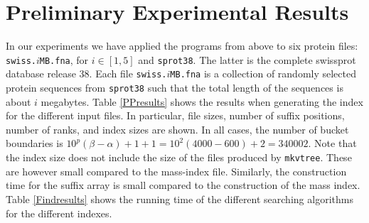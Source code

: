 \documentclass[12pt]{article}
\newcommand{\Mkvtree}[0]{{\small \texttt{mkvtree}}\xspace}
\newcommand{\Showfile}[1]{{\small \texttt{#1}}}
\begin{document}
\section{Preliminary Experimental Results}\label{Experiments}
In our experiments we have applied the programs from above to six protein
files: \Showfile{swiss.$i$MB.fna}, for \(i\in[1,5]\) and \Showfile{sprot38}.
The latter is the complete swissprot database release 38. 
Each file \Showfile{swiss.$i$MB.fna} is a collection of randomly selected
protein sequences from \Showfile{sprot38} such that the total length of
the sequences is about \(i\) megabytes.
Table \ref{PPresults} shows the results when generating the index
for the different input files. In particular, 
file sizes, number of suffix positions, number of ranks, and index sizes 
are shown.
In all cases, the number of bucket boundaries is 
\(10^{p}(\beta-\alpha)+1+1=10^{2}(4000-600)+2=340002\). Note that the 
index size does not include the size of the 
files produced by \Mkvtree. These are however small compared to the 
mass-index file. Similarly, the construction time for the suffix array is
small compared to the construction of the mass index.
Table \ref{Findresults} shows the running time of the different searching
algorithms for the different indexes.
\end{document}
